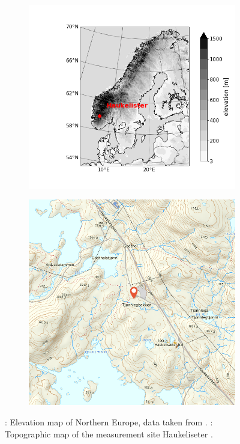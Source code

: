 \begin{figure}[!b]
	\centering
    \begin{subfigure}[b]{0.55\textwidth}
    	\includegraphics[trim={4.cm 1.8cm 0cm 2.2cm},clip,width=\textwidth]{./fig_Norway/Norway_elevation}
        \caption{}\label{fig:site:Norway}
    \end{subfigure}
    \begin{subfigure}[b]{0.44\columnwidth}
        \includegraphics[trim={.3cm 2.2cm 1.8cm 2.4cm},clip,width=\textwidth]{./fig_Norway/Haukeli_site}
        \caption{}\label{fig:site:kartverket}
      \end{subfigure}
	\caption{\protect{}: Elevation map of Northern Europe, data taken from \citet{noaa_etopo1_nodate}. \protect{}: Topographic map of the measurement site Haukeliseter \citep{kartverket_norgeskart_2018}.}\label{fig:site}
\end{figure} 
